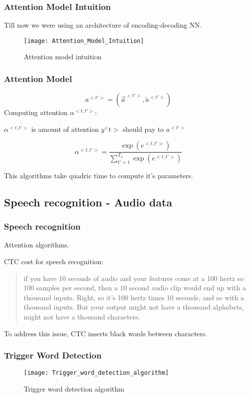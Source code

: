 \subsubsection{Attention Model Intuition}
Till now we were using an architecture of encoding-decoding NN.


\begin{figure}[H]
\centering
\texttt{[image: Attention\_Model\_Intuition]}
\caption{Attention model intuition}
\end{figure}

\subsubsection{Attention Model}
\begin{equation*}
    a^{<t'>} = (\overrightarrow{a}^{<t'>}, \overleftarrow{a}^{<t'>})
\end{equation*}
Computing attention $\alpha^{<t, t'>}$:

$\alpha^{<t, t'>}$ is amount of attention $y^<t>$ should pay to $a^{<t'>}$

\begin{equation*}
    \alpha^{<t, t'>} = \frac{\exp(e^{<t, t'>})}{\sum^{T_x}_{t'=1} \exp(e^{<t, t'>})}
\end{equation*}

This algorithms take quadric time to compute it's parameters.

\subsection{Speech recognition - Audio data}
\subsubsection{Speech recognition}
Attention algorithms.

CTC cost for speech recognition:
\begin{quote}
     if you have 10 seconds of audio and your features come at a 100 hertz so 100 samples per second, then a 10 second audio clip would end up with a thousand inputs. Right, so it's 100 hertz times 10 seconds, and so with a thousand inputs. But your output might not have a thousand alphabets, might not have a thousand characters.
\end{quote}
To address this issue, CTC inserts black words between characters.

\subsubsection{Trigger Word Detection}
\begin{figure}[H]
\centering
\texttt{[image: Trigger\_word\_detection\_algorithm]}
\caption{Trigger word detection algorithm}
\end{figure}

